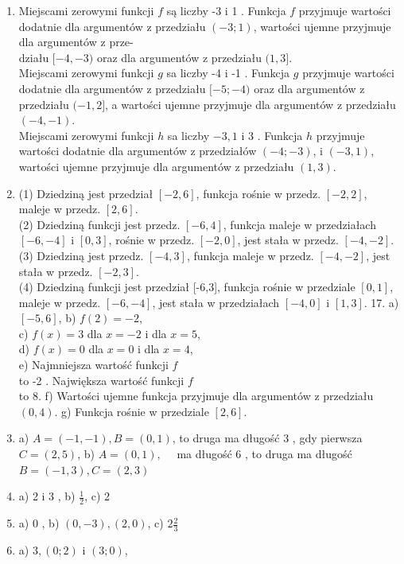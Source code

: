 \documentclass[10pt]{article}
\begin{document}
\begin{enumerate}
  \item Miejscami zerowymi funkcji \(f\) są liczby -3 i 1 . Funkcja \(f\) przyjmuje wartości dodatnie dla argumentów z przedziału \((-3 ; 1)\), wartości ujemne przyjmuje dla argumentów z prze-\\
działu \([-4,-3)\) oraz dla argumentów z przedziału \((1,3]\).\\
Miejscami zerowymi funkcji \(g\) sa liczby -4 i -1 . Funkcja \(g\) przyjmuje wartości dodatnie dla argumentów z przedziału \([-5 ;-4)\) oraz dla argumentów z przedziału \((-1,2]\), a wartości ujemne przyjmuje dla argumentów z przedziału \((-4,-1)\).\\
Miejscami zerowymi funkcji \(h\) sa liczby \(-3,1\) i 3 . Funkcja \(h\) przyjmuje wartości dodatnie dla argumentów z przedziałów \((-4 ;-3)\), i \((-3,1)\), wartości ujemne przyjmuje dla argumentów z przedziału \((1,3)\).
  \item (1) Dziedziną jest przedział \([-2,6]\), funkcja rośnie w przedz. \([-2,2]\), maleje w przedz. \([2,6]\).\\
(2) Dziedziną funkcji jest przedz. \([-6,4]\), funkcja maleje w przedziałach \([-6,-4]\) i \([0,3]\), rośnie w przedz. \([-2,0]\), jest stała w przedz. \([-4,-2]\).\\
(3) Dziedziną jest przedz. \([-4,3]\), funkcja maleje w przedz. \([-4,-2]\), jest stała w przedz. \([-2,3]\).\\[0pt]
(4) Dziedziną funkcji jest przedział [-6,3], funkcja rośnie w przedziale \([0,1]\), maleje w przedz. \([-6,-4]\), jest stała w przedziałach \([-4,0]\) i \([1,3]\). 17. a) \([-5,6]\), b) \(f(2)=-2\),\\
c) \(f(x)=3\) dla \(x=-2\) i dla \(x=5\),\\
d) \(f(x)=0\) dla \(x=0\) i dla \(x=4\),\\
e) Najmniejsza wartość funkcji \(f\)\\
to -2 . Największa wartość funkcji \(f\)\\
to 8. f) Wartości ujemne funkcja przyjmuje dla argumentów z przedziału \((0,4)\). g) Funkcja rośnie w przedziale \([2,6]\).
  \item a) \(A=(-1,-1), B=(0,1)\), to druga ma długość 3 , gdy pierwsza \(C=(2,5)\), b) \(A=(0,1), \quad\) ma długość 6 , to druga ma długość \(B=(-1,3), C=(2,3)\)
  \item a) 2 i 3 , b) \(\frac{1}{2}\), c) 2
  \item a) 0 , b) \((0,-3),(2,0)\), c) \(2 \frac{2}{3}\)
  \item a) \(3,(0 ; 2)\) i \((3 ; 0)\),\\

\end{enumerate}
\end{document}
